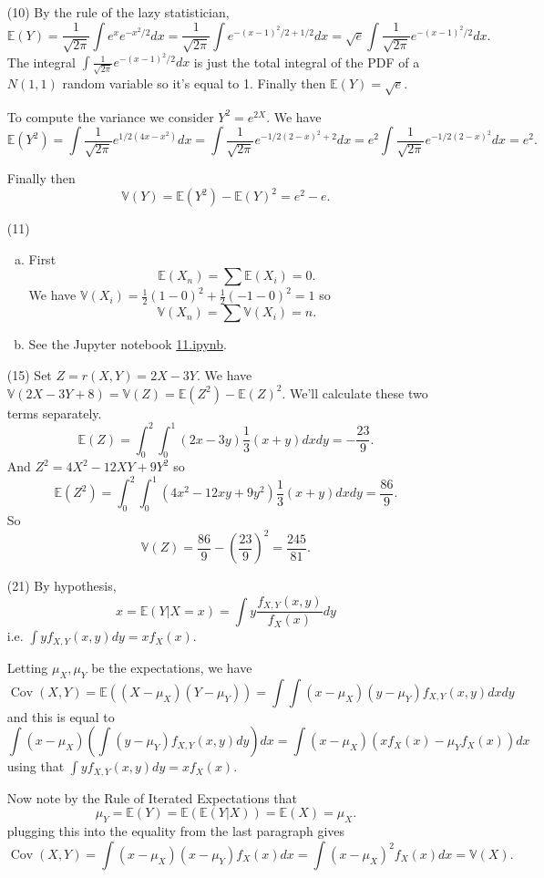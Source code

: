 \documentclass[10pt]{article}
\newcommand{\V}{\mathbb{V}}
\newcommand{\E}{\mathbb{E}}
\newcommand{\Cov}{\operatorname{Cov}}
\begin{document}
\begin{enumerate}
\item[(10)]
By the rule of the lazy statistician,
\[
\E(Y) = \frac{1}{\sqrt{2\pi}} \int e^x e^{-x^2/2}dx
= \frac{1}{\sqrt{2\pi}} \int e^{-(x-1)^2/2 + 1/2}dx
= \sqrt{e} \int \frac{1}{\sqrt{2\pi}} e^{-(x-1)^2/2}dx.
\]
The integral $\int \frac{1}{\sqrt{2\pi}} e^{-(x-1)^2/2}dx$ is just the total
integral of the PDF of a $N(1,1)$ random variable so it's equal to 1. Finally
then $\E(Y)=\sqrt{e}$.

To compute the variance we consider $Y^2 = e^{2X}$. We have
\[
\E(Y^2) = \int \frac{1}{\sqrt{2\pi}} e^{1/2(4x-x^2)}dx =
\int \frac{1}{\sqrt{2\pi}} e^{-1/2(2-x)^2+2}dx =
e^2 \int \frac{1}{\sqrt{2\pi}} e^{-1/2(2-x)^2}dx = e^2.
\]

Finally then
\[
\V(Y) = \E(Y^2) - \E(Y)^2 = e^2-e.
\]

\item[(11)]
\begin{enumerate}[(a)]
\item
First
\[
\E(X_n) = \sum \E(X_i) = 0.
\]
We have $\V(X_i)=\frac{1}{2}(1-0)^2 + \frac{1}{2}(-1-0)^2=1$ so
\[
\V(X_n) = \sum \V(X_i) = n.
\]
\item See the Jupyter notebook
\href{https://github.com/ajrasmus/some_of_statistics/blob/main/chapter_3/11.ipynb}{11.ipynb}.
\end{enumerate}

\item[(15)]
Set $Z=r(X,Y)=2X-3Y$. We have $\V(2X-3Y+8)=\V(Z)=\E(Z^2) - \E(Z)^2$.
We'll calculate these two terms separately.
\[
\E(Z) = \int_0^2 \int_0^1(2x-3y) \frac{1}{3}(x+y)dxdy=-\frac{23}{9}.
\]
And $Z^2=4X^2-12XY+9Y^2$ so
\[
\E(Z^2)=\int_0^2\int_0^1 (4x^2-12xy+9y^2)\frac{1}{3}(x+y)dxdy=\frac{86}{9}.
\]
So
\[
\V(Z)= \frac{86}{9} - \left(\frac{23}{9}\right)^2 = \frac{245}{81}.
\]

\item[(21)]
By hypothesis,
\[
x = \E(Y | X=x) = \int y \frac{f_{X,Y}(x,y)}{f_X(x)}dy
\]
i.e. $\int y f_{X,Y}(x,y)dy = x f_X(x)$.

Letting $\mu_X,\mu_Y$ be the expectations, we have
\[
\Cov(X,Y) = \E((X-\mu_X)(Y-\mu_Y)) =
\int \int (x-\mu_X)(y-\mu_Y)f_{X,Y}(x,y)dxdy
\]
and this is equal to
\[
\int (x-\mu_X)\left(\int (y-\mu_Y) f_{X,Y}(x,y)dy\right)dx
= \int (x-\mu_X) \left(xf_X(x) - \mu_Yf_X(x)\right)dx
\]
using that $\int y f_{X,Y}(x,y)dy = x f_X(x)$.

Now note by the Rule of Iterated Expectations that
\[
\mu_Y = \E(Y) = \E(\E(Y|X)) = \E(X) = \mu_X.
\]
plugging this into the equality from the last paragraph gives
\[
\Cov(X,Y) = \int (x-\mu_X)(x-\mu_Y)f_X(x)dx = \int(x-\mu_X)^2 f_X(x)dx=\V(X).
\]


\end{enumerate}
\end{document}
